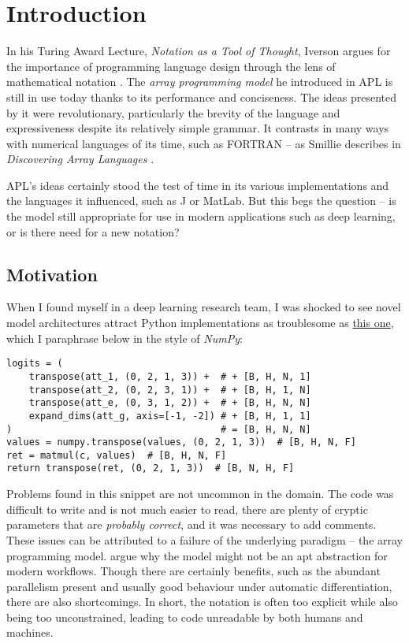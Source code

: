 \chapter{Introduction}

In his Turing Award Lecture, \textit{Notation as a Tool of Thought}, Iverson argues for the importance of programming language design through the lens of mathematical notation  \cite{iverson2007notation}. The \textit{array programming model} he introduced in APL is still in use today thanks to its performance and conciseness. The ideas presented by it were revolutionary, particularly the brevity of the language and expressiveness despite its relatively simple grammar. It contrasts in many ways with numerical languages of its time, such as FORTRAN -- as Smillie describes in \textit{Discovering Array Languages} \cite{smillie2000lecture}. 

APL's ideas certainly stood the test of time in its various implementations and the languages it influenced, such as J or MatLab. But this begs the question -- is the model still appropriate for use in modern applications such as deep learning, or is there need for a new notation?

\section{Motivation}

When I found myself in a deep learning research team, I was shocked to see novel model architectures attract Python implementations as troublesome as \href{https://github.com/google-deepmind/clrs/blob/8697f51663bd77548f4b3108816c84d163883361/clrs/_src/processors.py#L140}{this one}, which I paraphrase below in the style of \textit{NumPy}:
\begin{center} \begin{minipage}{0.65\textwidth}
\begin{verbatim}
logits = (
    transpose(att_1, (0, 2, 1, 3)) +  # + [B, H, N, 1]
    transpose(att_2, (0, 2, 3, 1)) +  # + [B, H, 1, N]
    transpose(att_e, (0, 3, 1, 2)) +  # + [B, H, N, N]
    expand_dims(att_g, axis=[-1, -2]) # + [B, H, 1, 1]
)                                     # = [B, H, N, N]
values = numpy.transpose(values, (0, 2, 1, 3))  # [B, H, N, F]
ret = matmul(c, values)  # [B, H, N, F]
return transpose(ret, (0, 2, 1, 3))  # [B, N, H, F]
\end{verbatim}
\end{minipage} \end{center}
Problems found in this snippet are not uncommon in the domain. The code was difficult to write and is not much easier to read, there are plenty of cryptic parameters that are \textit{probably correct}, and it was necessary to add comments. These issues can be attributed to a failure of the underlying paradigm -- the array programming model. \textcite{paszke2021getting} argue why the model might not be an apt abstraction for modern workflows. Though there are certainly benefits, such as the abundant parallelism present and usually good behaviour under automatic differentiation, there are also shortcomings. In short, the notation is often too explicit while also being too unconstrained, leading to code unreadable by both humans and machines. 


